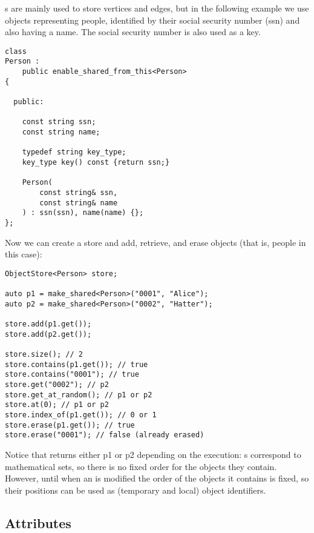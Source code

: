 s are mainly used to store vertices and edges, but in the following example we use objects representing people, identified by their social security number (ssn) and also having a name. The social security number is also used as a key.
\begin{lstlisting}[style=c++]
class
Person :
    public enable_shared_from_this<Person>
{
    
  public:
    
    const string ssn;
    const string name;
    
    typedef string key_type;
    key_type key() const {return ssn;}
    
    Person(
        const string& ssn, 
        const string& name
    ) : ssn(ssn), name(name) {};
};
\end{lstlisting}
Now we can create a store and add, retrieve, and erase objects (that is, people in this case):
\begin{lstlisting}[style=c++]
ObjectStore<Person> store;

auto p1 = make_shared<Person>("0001", "Alice");
auto p2 = make_shared<Person>("0002", "Hatter");

store.add(p1.get());
store.add(p2.get());

store.size(); // 2
store.contains(p1.get()); // true
store.contains("0001"); // true
store.get("0002"); // p2
store.get_at_random(); // p1 or p2
store.at(0); // p1 or p2
store.index_of(p1.get()); // 0 or 1
store.erase(p1.get()); // true
store.erase("0001"); // false (already erased)
\end{lstlisting}
Notice that  returns either p1 or p2 depending on the execution: s correspond to mathematical sets, so  there is no fixed order for the objects they contain. However, until when an  is modified the order of the objects it contains is fixed, so their positions can be used as (temporary and local) object identifiers.


\subsection{Attributes}

